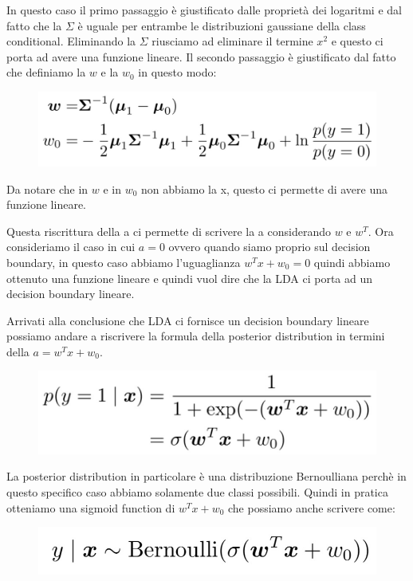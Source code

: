 \documentclass[14pt]{extreport}
\begin{document}
In questo caso il primo passaggio è giustificato dalle proprietà dei logaritmi e dal fatto che la $\Sigma$ è uguale per entrambe le distribuzioni
gaussiane della class conditional. Eliminando la $\Sigma$ riusciamo ad eliminare il termine $x^2$ e questo ci porta ad avere una funzione lineare. Il
secondo passaggio è giustificato dal fatto che definiamo la $w$ e la $w_0$ in questo modo:

\begin{figure}[H]
\centering
\includegraphics[width=0.7\linewidth]{171.jpeg}
\end{figure}
Da notare che in $w$ e in $w_0$ non abbiamo la x, questo ci permette di avere una funzione lineare.

Questa riscrittura della a ci permette di scrivere la a considerando $w$ e $w^T$. Ora consideriamo il caso in cui $a=0$ ovvero quando siamo proprio
sul decision boundary, in questo caso abbiamo l'uguaglianza $w^Tx+w_0 = 0$ quindi abbiamo ottenuto una funzione lineare e quindi vuol dire che la LDA
ci porta ad un decision boundary lineare.

Arrivati alla conclusione che LDA ci fornisce un decision boundary lineare possiamo andare a riscrivere la formula della posterior distribution in
termini della $a = w^Tx+w_0$.

\begin{figure}[H]
\centering
\includegraphics[width=0.5\linewidth]{172.jpeg}
\end{figure}

La posterior distribution in particolare è una distribuzione Bernoulliana perchè in questo specifico caso abbiamo solamente due classi possibili.
Quindi in pratica otteniamo una sigmoid function di $w^Tx+w_0$ che possiamo anche scrivere come:

\begin{figure}[H]
\centering
\includegraphics[width=0.5\linewidth]{173.jpeg}
\end{figure}
\end{document}
